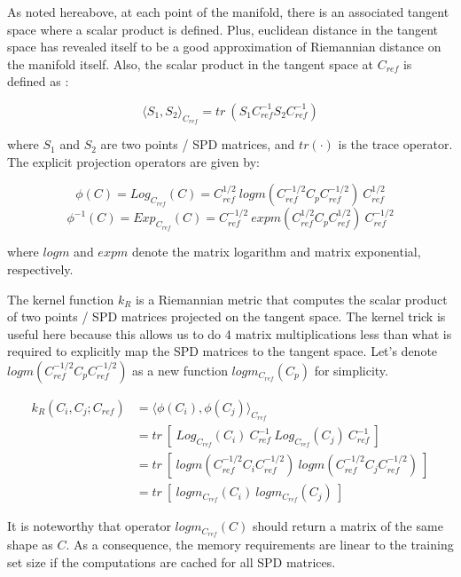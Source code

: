 \documentclass[a4paper,11pt]{report}
\begin{document}
As noted hereabove, at each point of the manifold, there is an associated tangent space where a scalar product is defined.
Plus, euclidean distance in the tangent space has revealed itself to be a good approximation of Riemannian distance
on the manifold itself. Also, the scalar product in the tangent space at $C_{ref}$ is defined as \citep{BARACHANT2013172}:

\begin{equation}
    \langle S_1, S_2 \rangle_{C_{ref}} = tr \ (S_1 C_{ref}^{-1} S_2 C_{ref}^{-1})
\end{equation}

\noindent where $S_1$ and $S_2$ are two points / SPD matrices, and $tr(\cdot)$ is the trace operator.
The explicit projection operators are given by:

\begin{equation}
    \phi(C) = Log_{C_{ref}} (C) = C_{ref}^{1/2} \ logm(C_{ref}^{-1/2} C_p C_{ref}^{-1/2}) \ C_{ref}^{1/2}
\end{equation}
\begin{equation}
    \phi^{-1}(C) = Exp_{C_{ref}} (C) = C_{ref}^{-1/2} \ expm(C_{ref}^{1/2} C_p C_{ref}^{1/2}) \ C_{ref}^{-1/2}
\end{equation}

\noindent where $logm$ and $expm$ denote the matrix logarithm and matrix exponential, respectively.

The kernel function $k_R$ is a Riemannian metric that computes the scalar product of two points / SPD matrices projected
on the tangent space. The kernel trick is useful here because this allows us to do 4 matrix multiplications less than
what is required to explicitly map the SPD matrices to the tangent space.
Let's denote $logm(C_{ref}^{-1/2} C_p C_{ref}^{-1/2})$ as a new function $logm_{C_{ref}} (C_p)$ for simplicity.

\begin{align}
    k_R(C_i, C_j; C_{ref}) & = \langle \phi(C_i), \phi(C_j) \rangle_{C_{ref}} \\
    & = tr \ [\ Log_{C_{ref}} (C_i) \ C_{ref}^{-1} \ Log_{C_{ref}} (C_j) \ C_{ref}^{-1} \ ] \\
    & = tr \ [\ logm(C_{ref}^{-1/2} C_i C_{ref}^{-1/2}) \ logm(C_{ref}^{-1/2} C_j C_{ref}^{-1/2}) \ ] \\
    & = tr \ [\ logm_{C_{ref}} (C_i) \ logm_{C_{ref}} (C_j) \ ] 
\end{align}

It is noteworthy that operator $logm_{C_{ref}} (C)$ should return a matrix of the same shape as $C$.
As a consequence, the memory requirements are linear to the training set size if the computations
are cached for all SPD matrices.
\end{document}
